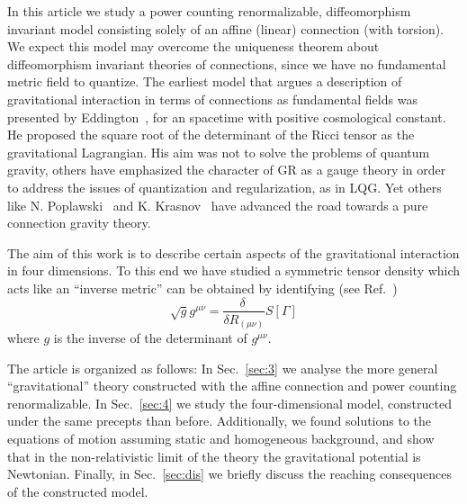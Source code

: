 \documentclass[twocolumn,aps,showpacs,showkeys,prl,superscriptaddress]{revtex4-1}
\begin{document}
In this article we study a power counting renormalizable,  diffeomorphism invariant model  consisting  solely of an affine (linear) connection  (with torsion). We expect  this model may  overcome  the uniqueness theorem about diffeomorphism invariant theories of connections, since we  have no fundamental metric field to quantize. The earliest model that argues  a description of gravitational interaction in terms of connections as fundamental fields  was presented by Eddington~\cite{Eddington1923math}, for an spacetime with positive cosmological constant. He proposed the square root of the determinant of the Ricci tensor as the gravitational Lagrangian. His aim was not to solve the problems of quantum gravity,  others have emphasized the character of GR as a gauge theory in order to address the issues of quantization and regularization, as in LQG. Yet others like N. Poplawski~\cite{Poplawski:2012bw} and K. Krasnov~\cite{Krasnov:2011pp} have advanced the road towards a pure connection gravity theory.

The aim of this work is to describe certain aspects of the gravitational interaction in four dimensions. To this end we have studied a  symmetric tensor density which acts like an ``inverse metric'' can be obtained by identifying (see Ref.~\cite{Poplawski:2012bw})
\begin{equation}\label{metric}
  \sqrt{g} g^{\mu\nu} = \frac{\delta\ }{\delta R_{(\mu\nu)}} S[\Gamma]
\end{equation}
where $g$ is the inverse of the determinant of $g^{\mu\nu}$.

The article is organized as follows: In Sec.~\ref{sec:3} we analyse the more general ``gravitational'' theory constructed with the affine connection and power counting renormalizable. In Sec.~\ref{sec:4} we study the four-dimensional model, constructed under the same precepts than before. Additionally, we found solutions to the equations of motion assuming static and homogeneous background, and show that in the non-relativistic limit of the theory the gravitational potential is Newtonian. Finally, in Sec.~\ref{sec:dis} we briefly discuss the reaching consequences of the constructed model.



\end{document}
